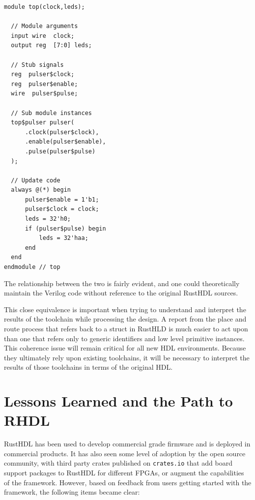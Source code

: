 \documentclass[conference]{IEEEtran}
\begin{document}
\begin{verbatim}
module top(clock,leds);
  
  // Module arguments
  input wire  clock;
  output reg  [7:0] leds;
  
  // Stub signals
  reg  pulser$clock;
  reg  pulser$enable;
  wire  pulser$pulse;
  
  // Sub module instances
  top$pulser pulser(
      .clock(pulser$clock),
      .enable(pulser$enable),
      .pulse(pulser$pulse)
  );
  
  // Update code
  always @(*) begin
      pulser$enable = 1'b1;
      pulser$clock = clock;
      leds = 32'h0;
      if (pulser$pulse) begin
          leds = 32'haa;
      end
  end  
endmodule // top
\end{verbatim}

The relationship between the two is fairly evident, and one could theoretically maintain the Verilog
code without reference to the original RustHDL sources.

This close equivalence is important when trying to understand and interpret 
the results of the toolchain while processing the design.  A report from the place and route 
process that refers back to a struct in RustHLD is much easier to act upon than one that 
refers only to generic identifiers and low level primitive instances. This coherence issue will remain 
critical for all new HDL environments.  Because 
they ultimately rely upon existing toolchains, it will be necessary to interpret the results of those toolchains
in terms of the original HDL.


\section{Lessons Learned and the Path to RHDL}\label{sec:future}

RustHDL has been used to develop commercial grade firmware and is deployed in commercial products.  It has also seen 
some level of adoption by the open source community, with third party crates published on \verb|crates.io| that add board
support packages to RustHDL for different FPGAs, or augment the capabilities of the framework.  However, based on
feedback from users getting started with the framework, the following items became clear:
\end{document}
